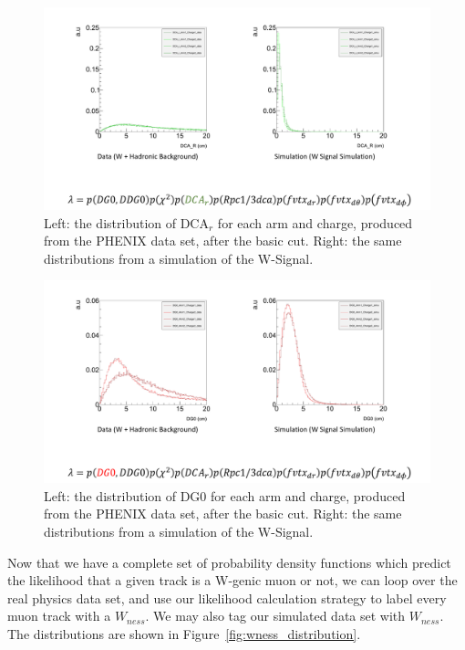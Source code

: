 \begin{figure}
  \centering
  \includegraphics[width=\linewidth,trim=4 4 4 4,clip]{./figures/pdf_dcar.png}
  \caption{
    Left: the distribution of DCA$_r$ for each arm and charge, produced from the
    PHENIX data set, after the basic cut. Right: the same distributions from a
    simulation of the W-Signal.
  }
  \label{fig:pdf_dcar}
\end{figure}

\begin{figure}
  \centering
  \includegraphics[width=\linewidth,trim=4 4 4 4,clip]{./figures/pdf_DG0.png}
  \caption{
    Left: the distribution of DG0 for each arm and charge, produced from the
    PHENIX data set, after the basic cut. Right: the same distributions from a
    simulation of the W-Signal.
  }
  \label{fig:pdf_DG0}
\end{figure}

Now that we have a complete set of probability density functions which predict
the likelihood that a given track is a W-genic muon or not, we can loop over the
real physics data set, and use our likelihood calculation strategy to label
every muon track with a $W_{ness}$. We may also tag our simulated data set with
$W_{ness}$. The distributions are shown in
Figure~\ref{fig:wness_distribution}.

